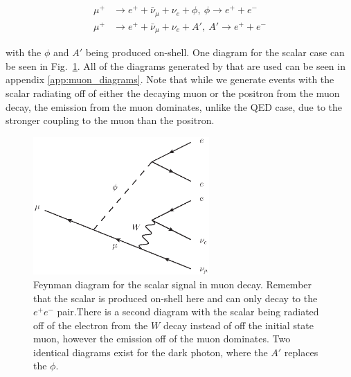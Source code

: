 \begin{align}
    \mu^+ & \rightarrow e^+ + \bar{\nu}_\mu + \nu_e + \phi,~\phi \rightarrow e^+ + e^- \\
    \mu^+ & \rightarrow e^+ + \bar{\nu}_\mu + \nu_e + A',~A' \rightarrow e^+ + e^-
\end{align}

\noindent with the $\phi$ and $A'$ being produced on-shell.
One diagram for the scalar case can be seen in Fig.\ \ref{fig:mu_eeenunu_scalar}.
All of the diagrams generated by \madgraph that are used can be seen in appendix \ref{app:muon_diagrams}.
Note that while we generate events with the scalar radiating off of either the decaying muon or the positron from the muon decay, the emission from the muon dominates, unlike the QED case, due to the stronger coupling to the muon than the positron.

\begin{figure}[h]
    \centering
    \includegraphics[width=0.6\textwidth]{Figures/feynman_diagrams/mu_eeenunu_scalar}
    \caption[Feynman diagram for the scalar signal in muon decay.]{Feynman diagram for the scalar signal in muon decay. Remember that the scalar is produced on-shell here and can only decay to the $e^+ e^-$ pair.There is a second diagram with the scalar being radiated off of the electron from the $W$ decay instead of off the initial state muon, however the emission off of the muon dominates. Two identical diagrams exist for the dark photon, where the $A'$ replaces the $\phi$.}
    \label{fig:mu_eeenunu_scalar}
\end{figure}

